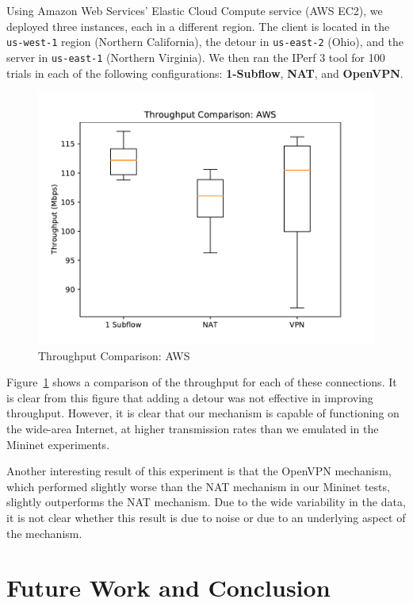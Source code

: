 \documentclass{cwru}
\begin{document}
Using Amazon Web Services' Elastic Cloud Compute service (AWS EC2), we deployed
three instances, each in a different region. The client is located in the
\texttt{us-west-1} region (Northern California), the detour in
\texttt{us-east-2} (Ohio), and the server in \texttt{us-east-1} (Northern
Virginia). We then ran the IPerf 3 tool for 100 trials in each of the following
configurations: \textbf{1-Subflow}, \textbf{NAT}, and \textbf{OpenVPN}.

\begin{figure}
  \centering
  \includegraphics{figures/aws.pdf}
  \caption{Throughput Comparison: AWS}
  \label{fig:aws}
\end{figure}

Figure~\ref{fig:aws} shows a comparison of the throughput for each of these
connections. It is clear from this figure that adding a detour was not effective
in improving throughput. However, it is clear that our mechanism is capable of
functioning on the wide-area Internet, at higher transmission rates than we
emulated in the Mininet experiments.

Another interesting result of this experiment is that the OpenVPN mechanism,
which performed slightly worse than the NAT mechanism in our Mininet tests,
slightly outperforms the NAT mechanism. Due to the wide variability in the data,
it is not clear whether this result is due to noise or due to an underlying
aspect of the mechanism.

\chapter{Future Work and Conclusion}
\label{c:fwconclude}

\backmatter
\appendix



\end{document}
